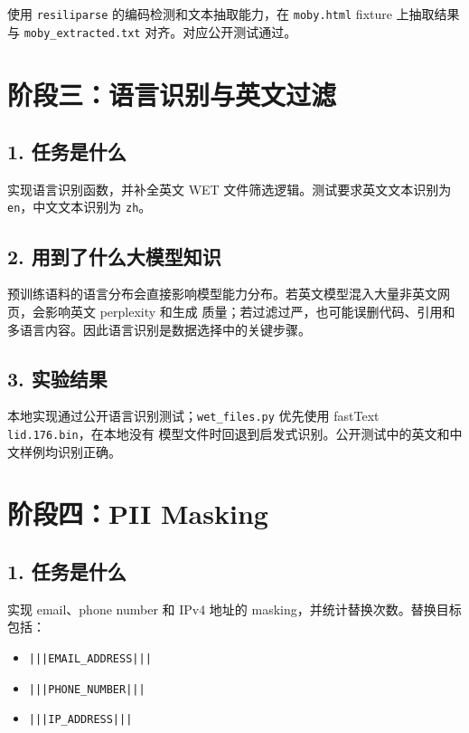 \documentclass[UTF8,11pt]{ctexart}
\begin{document}
使用 \texttt{resiliparse} 的编码检测和文本抽取能力，在 \texttt{moby.html} fixture 上抽取结果与
\texttt{moby\_extracted.txt} 对齐。对应公开测试通过。

\section{阶段三：语言识别与英文过滤}

\subsection*{1. 任务是什么}

实现语言识别函数，并补全英文 WET 文件筛选逻辑。测试要求英文文本识别为 \texttt{en}，中文文本识别为
\texttt{zh}。

\subsection*{2. 用到了什么大模型知识}

预训练语料的语言分布会直接影响模型能力分布。若英文模型混入大量非英文网页，会影响英文 perplexity 和生成
质量；若过滤过严，也可能误删代码、引用和多语言内容。因此语言识别是数据选择中的关键步骤。

\subsection*{3. 实验结果}

本地实现通过公开语言识别测试；\texttt{wet\_files.py} 优先使用 fastText \texttt{lid.176.bin}，在本地没有
模型文件时回退到启发式识别。公开测试中的英文和中文样例均识别正确。

\section{阶段四：PII Masking}

\subsection*{1. 任务是什么}

实现 email、phone number 和 IPv4 地址的 masking，并统计替换次数。替换目标包括：

\begin{itemize}
  \item \texttt{|||EMAIL\_ADDRESS|||}
  \item \texttt{|||PHONE\_NUMBER|||}
  \item \texttt{|||IP\_ADDRESS|||}
\end{itemize}
\end{document}
